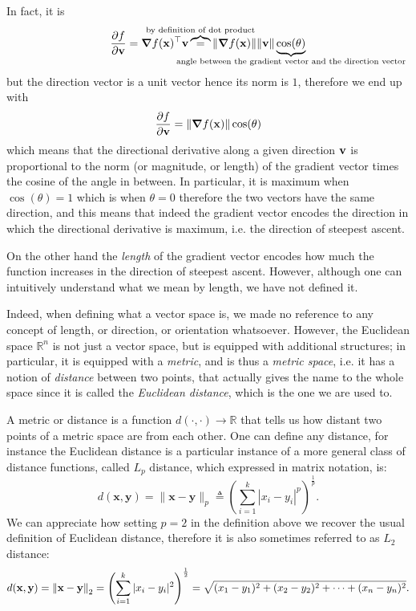In fact, it is
\begin{equation}
    \pdv{f}{\vb{v}}(\vb{x}) = \grad f (\vb{x})^{\top} \vb{v} \overbrace{=}^{\mathclap{\text{by definition of dot product}}} \norm{\grad f (\vb{x})} \norm{\vb{v}} \underbrace{\cos(\theta)}_{\mathclap{\text{angle between the gradient vector and the direction vector}}}
\end{equation}
but the direction vector is a unit vector hence its norm is $1$, therefore we end up with
\begin{equation}
    \pdv{f}{\vb{v}}(\vb{x}) = \norm{\grad f (\vb{x})} \cos(\theta)
    \label{eq:4:3:dir_der_grad}
\end{equation}
which means that the directional derivative along a given direction $\vb{v}$ is proportional to the norm (or magnitude, or length) of the gradient vector times the cosine of the angle in between. In particular, it is maximum when $\cos(\theta) = 1$ which is when $\theta = 0$ therefore the two vectors have the same direction, and this means that indeed the gradient vector encodes the direction in which the directional derivative is maximum, i.e. the direction of steepest ascent.

On the other hand the \emph{length} of the gradient vector encodes how much the function increases in the direction of steepest ascent. However, although one can intuitively understand what we mean by length, we have not defined it.

Indeed, when defining what a vector space is, we made no reference to any concept of length, or direction, or orientation whatsoever. However, the Euclidean space $\mathbb{R}^n$ is not just a vector space, but is equipped with additional structures; in particular, it is equipped with a \emph{metric}, and is thus a \emph{metric space}, i.e. it has a notion of \emph{distance} between two points, that actually gives the name to the whole space since it is called the \emph{Euclidean distance}, which is the one we are used to. 

A metric or distance is a function $d(\cdot, \cdot) \to \mathbb{R}$ that tells us how distant two points of a metric space are from each other. One can define any distance, for instance the Euclidean distance is a particular instance of a more general class of distance functions, called $L_p$ distance, which expressed in matrix notation, is:
\begin{equation}
	d(\mathbf{x},\mathbf{y}) = \|\mathbf{x} - \mathbf{y}\|_p \triangleq \left( \sum_{i=1}^{k}|x_i - y_i|^p\right)^{\frac{1}{p}}.
\end{equation}
We can appreciate how setting $p = 2$ in the definition above we recover the usual definition of Euclidean distance, therefore it is also sometimes referred to as $L_2$ distance:
\begin{equation}
    d(\vb{x}, \vb{y}) = \norm{\vb{x} - \vb{y}}_2 = \left( \sum_{i=1}^{k}|x_i - y_i|^2 \right)^{\frac{1}{2}} = \sqrt{(x_1 - y_1)^2 + (x_2 - y_2)^2 + \dots + (x_n - y_n)^2}.
\end{equation}

